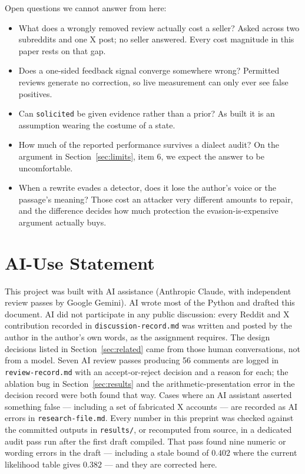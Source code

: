 \documentclass{article}
\begin{document}
Open questions we cannot answer from here:

\begin{itemize}
    \item What does a wrongly removed review actually cost a seller? Asked
          across two subreddits and one X post; no seller answered. Every cost
          magnitude in this paper rests on that gap.
    \item Does a one-sided feedback signal converge somewhere wrong? Permitted
          reviews generate no correction, so live measurement can only ever see
          false positives.
    \item Can \texttt{solicited} be given evidence rather than a prior? As
          built it is an assumption wearing the costume of a state.
    \item How much of the reported performance survives a dialect audit? On the
          argument in Section~\ref{sec:limits}, item 6, we expect the answer to be
          uncomfortable.
    \item When a rewrite evades a detector, does it lose the author's voice or
          the passage's meaning? Those cost an attacker very different amounts to
          repair, and the difference decides how much protection the
          evasion-is-expensive argument actually buys.
\end{itemize}

\appendix

\section*{AI-Use Statement}

This project was built with AI assistance (Anthropic Claude, with independent
review passes by Google Gemini). AI wrote most of the Python and drafted this
document. AI did not participate in any public discussion: every Reddit and X
contribution recorded in \texttt{discussion-record.md} was written and posted by
the author in the author's own words, as the assignment requires. The design
decisions listed in Section~\ref{sec:related} came from those human conversations, not from a
model. Seven AI review passes producing 56 comments are logged in
\texttt{review-record.md} with an accept-or-reject decision and a reason for
each; the ablation bug in Section~\ref{sec:results} and the arithmetic-presentation error in the
decision record were both found that way. Cases where an AI assistant asserted
something false --- including a set of fabricated X accounts --- are recorded as
AI errors in \texttt{research-file.md}. Every number in this preprint was checked
against the committed outputs in \texttt{results/}, or recomputed from source,
in a dedicated audit pass run after the first draft compiled. That pass found
nine numeric or wording errors in the draft --- including a stale bound of
$0.402$ where the current likelihood table gives $0.382$ --- and they are
corrected here.
\end{document}
